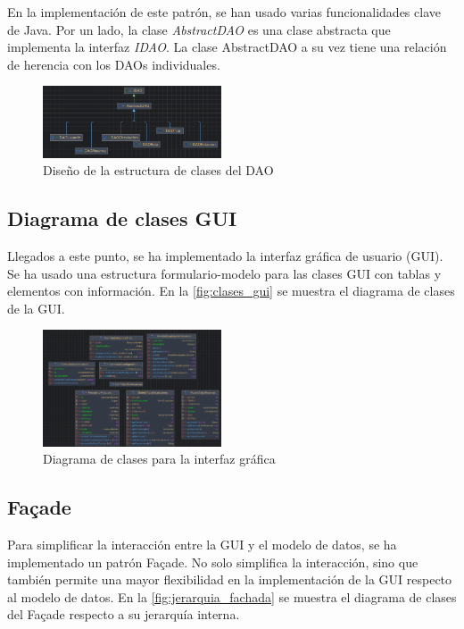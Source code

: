 En la implementación de este patrón, se han usado varias funcionalidades clave de Java.
Por un lado, la clase \textit{AbstractDAO} es una clase abstracta que implementa la interfaz \textit{IDAO}.
La clase AbstractDAO a su vez tiene una relación de herencia con los DAOs individuales.
\begin{figure}
    \centering
    \includegraphics[width=200px]{recursos/diagramas/daoEstructura}
    \caption{Diseño de la estructura de clases del DAO}
    \label{fig:clases_dao}
\end{figure}

\subsection{Diagrama de clases GUI}\label{subsec:diagrama_de_clases_gui}
Llegados a este punto, se ha implementado la interfaz gráfica de usuario (GUI).
Se ha usado una estructura formulario-modelo para las clases GUI con tablas y elementos con información.
En la \autoref{fig:clases_gui} se muestra el diagrama de clases de la GUI\@.
\begin{figure}
    \centering
    \includegraphics[width=200px]{recursos/diagramas/gui}
    \caption{Diagrama de clases para la interfaz gráfica}
    \label{fig:clases_gui}
\end{figure}

\subsection{Façade}\label{subsec:facade}
Para simplificar la interacción entre la GUI y el modelo de datos, se ha implementado un patrón Façade.
No solo simplifica la interacción, sino que también permite una mayor flexibilidad en la implementación de la GUI respecto al modelo de datos.
En la \autoref{fig:jerarquia_fachada} se muestra el diagrama de clases del Façade respecto a su jerarquía interna.

